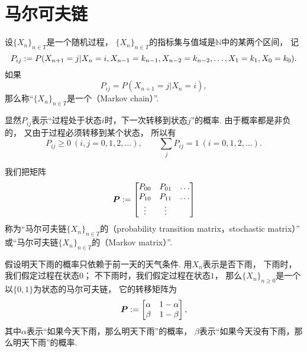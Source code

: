\section{马尔可夫链}
\begin{definition}
设\(\{X_n\}_{n \in T}\)是一个随机过程，
\(\{X_n\}_{n \in T}\)的指标集与值域是\(\mathbb{N}\)中的某两个区间，
记\begin{equation*}
	P_{ij}
	:=
	P(
		X_{n+1} = j
		\vert
		X_n = i,
		X_{n-1} = k_{n-1},
		X_{n-2} = k_{n-2},
		\dotsc,
		X_1 = k_1,
		X_0 = k_0
	).
\end{equation*}
如果\begin{equation*}
	P_{ij}
	= P(
		X_{n+1} = j
		\vert
		X_n = i
	),
\end{equation*}
那么称“\(\{X_n\}_{n \in T}\)是一个（Markov chain）”.
\end{definition}

显然\(P_{ij}\)表示“过程处于状态\(i\)时，下一次转移到状态\(j\)”的概率.
由于概率都是非负的，
又由于过程必须转移到某个状态，
所以有\begin{equation*}
	P_{ij} \geq 0\ (i,j=0,1,2,\dotsc),
	\qquad
	\sum_j P_{ij} = 1\ (i=0,1,2,\dotsc).
\end{equation*}

我们把矩阵\begin{equation*}
	\boldsymbol{P}
	:= \begin{bmatrix}
		P_{00} & P_{01} & \dots \\
		P_{10} & P_{11} & \dots \\
		\vdots & \vdots & \\
	\end{bmatrix}
\end{equation*}
称为“马尔可夫链\(\{X_n\}_{n \in T}\)的（probability transition matrix，stochastic matrix）”
或“马尔可夫链\(\{X_n\}_{n \in T}\)的（Markov matrix）”.

\begin{example}[天气预报]
假设明天下雨的概率只依赖于前一天的天气条件.
用\(X_n\)表示是否下雨，
下雨时，我们假定过程在状态\(0\)；
不下雨时，我们假定过程在状态\(1\)，
那么\(\{X_n\}_{n\geq0}\)是一个以\(\{0,1\}\)为状态的马尔可夫链，
它的转移矩阵为\begin{equation*}
	\boldsymbol{P} := \begin{bmatrix}
		\alpha & 1-\alpha \\
		\beta & 1-\beta
	\end{bmatrix},
\end{equation*}
其中\(\alpha\)表示“如果今天下雨，那么明天下雨”的概率，
\(\beta\)表示“如果今天没有下雨，那么明天下雨”的概率.
\end{example}

